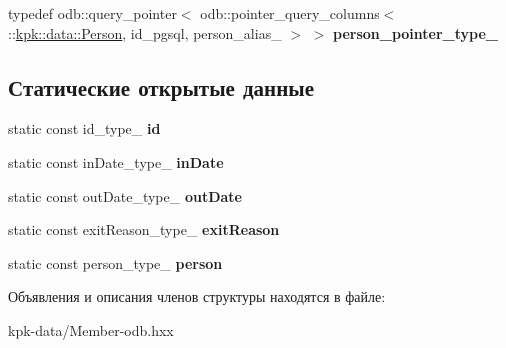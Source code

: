 \begin{DoxyCompactItemize}
\item 
typedef odb\+::query\+\_\+pointer$<$ odb\+::pointer\+\_\+query\+\_\+columns$<$ \+::\hyperlink{classkpk_1_1data_1_1_person}{kpk\+::data\+::\+Person}, id\+\_\+pgsql, person\+\_\+alias\+\_\+ $>$ $>$ {\bfseries person\+\_\+pointer\+\_\+type\+\_\+}\hypertarget{structodb_1_1query__columns_3_01_1_1kpk_1_1data_1_1_member_00_01id__pgsql_00_01_a_01_4_aa174c919388bec8f8bd7724f03e66a2c}{}\label{structodb_1_1query__columns_3_01_1_1kpk_1_1data_1_1_member_00_01id__pgsql_00_01_a_01_4_aa174c919388bec8f8bd7724f03e66a2c}

\end{DoxyCompactItemize}
\subsection*{Статические открытые данные}
\begin{DoxyCompactItemize}
\item 
static const id\+\_\+type\+\_\+ {\bfseries id}\hypertarget{structodb_1_1query__columns_3_01_1_1kpk_1_1data_1_1_member_00_01id__pgsql_00_01_a_01_4_a84197011a427fe2ac7ee202ecd468640}{}\label{structodb_1_1query__columns_3_01_1_1kpk_1_1data_1_1_member_00_01id__pgsql_00_01_a_01_4_a84197011a427fe2ac7ee202ecd468640}

\item 
static const in\+Date\+\_\+type\+\_\+ {\bfseries in\+Date}\hypertarget{structodb_1_1query__columns_3_01_1_1kpk_1_1data_1_1_member_00_01id__pgsql_00_01_a_01_4_a295f6ff4f33b7ca01bf7c58a35752484}{}\label{structodb_1_1query__columns_3_01_1_1kpk_1_1data_1_1_member_00_01id__pgsql_00_01_a_01_4_a295f6ff4f33b7ca01bf7c58a35752484}

\item 
static const out\+Date\+\_\+type\+\_\+ {\bfseries out\+Date}\hypertarget{structodb_1_1query__columns_3_01_1_1kpk_1_1data_1_1_member_00_01id__pgsql_00_01_a_01_4_a0f80a29f8d2ae4c9b2088211e3c153d9}{}\label{structodb_1_1query__columns_3_01_1_1kpk_1_1data_1_1_member_00_01id__pgsql_00_01_a_01_4_a0f80a29f8d2ae4c9b2088211e3c153d9}

\item 
static const exit\+Reason\+\_\+type\+\_\+ {\bfseries exit\+Reason}\hypertarget{structodb_1_1query__columns_3_01_1_1kpk_1_1data_1_1_member_00_01id__pgsql_00_01_a_01_4_a8ae5239d38cba7c39e5256aaf8d36339}{}\label{structodb_1_1query__columns_3_01_1_1kpk_1_1data_1_1_member_00_01id__pgsql_00_01_a_01_4_a8ae5239d38cba7c39e5256aaf8d36339}

\item 
static const person\+\_\+type\+\_\+ {\bfseries person}\hypertarget{structodb_1_1query__columns_3_01_1_1kpk_1_1data_1_1_member_00_01id__pgsql_00_01_a_01_4_a558ea69025ad83b811c43f2f928be2e6}{}\label{structodb_1_1query__columns_3_01_1_1kpk_1_1data_1_1_member_00_01id__pgsql_00_01_a_01_4_a558ea69025ad83b811c43f2f928be2e6}

\end{DoxyCompactItemize}


Объявления и описания членов структуры находятся в файле\+:\begin{DoxyCompactItemize}
\item 
kpk-\/data/Member-\/odb.\+hxx\end{DoxyCompactItemize}
